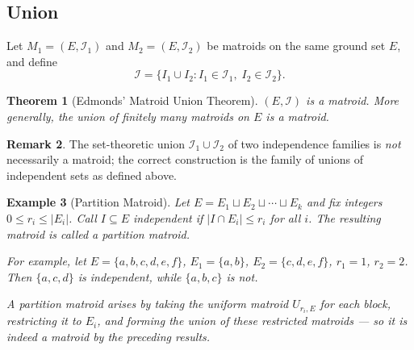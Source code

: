 \documentclass[11pt]{article}
\theoremstyle{plain}
\newtheorem{theorem}{Theorem}[section]
\newtheorem{example}[theorem]{Example}
\theoremstyle{definition}
\newtheorem{remark}[theorem]{Remark}
\begin{document}
\subsection{Union}
 
Let $M_1 = (E, \mathcal{I}_1)$ and $M_2 = (E, \mathcal{I}_2)$ be matroids on
the same ground set $E$, and define
\[
  \mathcal{I} = \{I_1 \cup I_2 : I_1 \in \mathcal{I}_1,\; I_2 \in \mathcal{I}_2\}.
\]
 
\begin{theorem}[Edmonds' Matroid Union Theorem]
$(E, \mathcal{I})$ is a matroid.
More generally, the union of finitely many matroids on $E$ is a matroid.
\end{theorem}
 
\begin{remark}
The set-theoretic union $\mathcal{I}_1 \cup \mathcal{I}_2$ of two independence
families is \emph{not} necessarily a matroid; the correct construction is the
family of unions of independent sets as defined above.
\end{remark}
 
\begin{example}[Partition Matroid]
Let $E = E_1 \sqcup E_2 \sqcup \cdots \sqcup E_k$ and fix integers
$0 \le r_i \le |E_i|$.
Call $I \subseteq E$ independent if $|I \cap E_i| \le r_i$ for all $i$.
The resulting matroid is called a \emph{partition matroid}.
 
For example, let $E = \{a,b,c,d,e,f\}$, $E_1 = \{a,b\}$,
$E_2 = \{c,d,e,f\}$, $r_1 = 1$, $r_2 = 2$.
Then $\{a,c,d\}$ is independent, while $\{a,b,c\}$ is not.
 
A partition matroid arises by taking the uniform matroid $U_{r_i,E}$ for
each block, restricting it to $E_i$, and forming the union of these
restricted matroids — so it is indeed a matroid by the preceding results.
\end{example}
 
\end{document}
